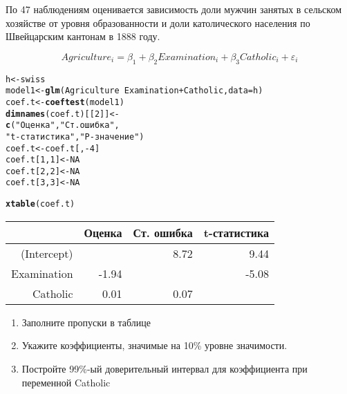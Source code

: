 \documentclass[pdftex,11pt,openany]{book}\usepackage[]{graphicx}\usepackage[]{color}
\makeatletter
\newcommand{\hlnum}[1]{\textcolor[rgb]{0.686,0.059,0.569}{#1}}%
\newcommand{\hlstr}[1]{\textcolor[rgb]{0.192,0.494,0.8}{#1}}%
\newcommand{\hlopt}[1]{\textcolor[rgb]{0,0,0}{#1}}%
\newcommand{\hlstd}[1]{\textcolor[rgb]{0.345,0.345,0.345}{#1}}%
\newcommand{\hlkwb}[1]{\textcolor[rgb]{0.69,0.353,0.396}{#1}}%
\newcommand{\hlkwc}[1]{\textcolor[rgb]{0.333,0.667,0.333}{#1}}%
\newcommand{\hlkwd}[1]{\textcolor[rgb]{0.737,0.353,0.396}{\textbf{#1}}}%
\newenvironment{kframe}{%
 \def\at@end@of@kframe{}%
 \ifinner\ifhmode%
  \def\at@end@of@kframe{\end{minipage}}%
  \begin{minipage}{\columnwidth}%
 \fi\fi%
 \def\FrameCommand##1{\hskip\@totalleftmargin \hskip-\fboxsep
 \colorbox{shadecolor}{##1}\hskip-\fboxsep
     \hskip-\linewidth \hskip-\@totalleftmargin \hskip\columnwidth}%
 \MakeFramed {\advance\hsize-\width
   \@totalleftmargin\z@ \linewidth\hsize
   \@setminipage}}%
 {\par\unskip\endMakeFramed%
 \at@end@of@kframe}
\newenvironment{knitrout}{}{} %
\makeatother
\begin{document}
\begin{problem}
 По 47 наблюдениям оценивается зависимость доли мужчин занятых в сельском хозяйстве от уровня образованности и доли католического населения по Швейцарским кантонам в 1888 году.

\[Agriculture_i=\beta_1+\beta_2 Examination_i+\beta_3 Catholic_i+\varepsilon_i\]

\begin{knitrout}
\color{fgcolor}\begin{kframe}
\begin{alltt}
\hlstd{h} \hlkwb{<-} \hlstd{swiss}
\hlstd{model1} \hlkwb{<-} \hlkwd{glm}\hlstd{(Agriculture}\hlopt{~}\hlstd{Examination}\hlopt{+}\hlstd{Catholic,}\hlkwc{data}\hlstd{=h)}
\hlstd{coef.t} \hlkwb{<-} \hlkwd{coeftest}\hlstd{(model1)}
\hlkwd{dimnames}\hlstd{(coef.t)[[}\hlnum{2}\hlstd{]]} \hlkwb{<-}
    \hlkwd{c}\hlstd{(}\hlstr{"Оценка"}\hlstd{,}\hlstr{"Ст. ошибка"}\hlstd{,}
    \hlstr{"t-статистика"}\hlstd{,} \hlstr{"P-значение"}\hlstd{)}
\hlstd{coef.t} \hlkwb{<-} \hlstd{coef.t[,}\hlopt{-}\hlnum{4}\hlstd{]}
\hlstd{coef.t[}\hlnum{1}\hlstd{,}\hlnum{1}\hlstd{]} \hlkwb{<-} \hlnum{NA}
\hlstd{coef.t[}\hlnum{2}\hlstd{,}\hlnum{2}\hlstd{]} \hlkwb{<-} \hlnum{NA}
\hlstd{coef.t[}\hlnum{3}\hlstd{,}\hlnum{3}\hlstd{]} \hlkwb{<-} \hlnum{NA}
\end{alltt}
\end{kframe}
\end{knitrout}




\begin{kframe}
\begin{alltt}
\hlkwd{xtable}\hlstd{(coef.t)}
\end{alltt}
\end{kframe}%
\begin{table}[ht]
\centering
\begin{tabular}{rrrr}
  \hline
 & Оценка & Ст. ошибка & t-статистика \\ 
  \hline
(Intercept) &  & 8.72 & 9.44 \\ 
  Examination & -1.94 &  & -5.08 \\ 
  Catholic & 0.01 & 0.07 &  \\ 
   \hline
\end{tabular}
\end{table}



\begin{enumerate}
\item Заполните пропуски в таблице
\item Укажите коэффициенты, значимые на 10\% уровне значимости.
\item Постройте 99\%-ый доверительный интервал для коэффициента при переменной Catholic 
\end{enumerate}


\end{problem}
\end{document}
